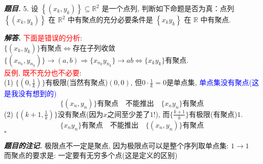 \documentclass[10pt, a4paper, oneside]{ctexart}
\newenvironment{problem}{\begin{framed}\par\noindent\textbf{\textit{题目. }}}{\end{framed}\par}
\newenvironment{solution}{%
  \par\noindent\textbf{\textit{解答. }}\ignorespaces
}{%
  \hfill\ensuremath{\square}\par %
}
\newenvironment{note}{\par\noindent\textbf{\textit{题目的注记. }}\ignorespaces}{\par}
\begin{document}
\begin{problem}
5. 设 $\left\{\left(x_k, y_k\right)\right\} \subseteq \mathbb{R}^2$ 是一个点列, 判断如下命题是否为真：点列 $\left\{\left(x_k, y_k\right)\right\}$ 在 $\mathbb{R}^2$ 中有聚点的充分必要条件是 $\left\{x_k y_k\right\}$ 在 $\mathbb{R}$ 中有聚点.
\end{problem}
\begin{solution}\textcolor{red}{下面是错误的分析}: \\$\{(x_k,y_k)\}$有聚点$\iff$存在子列收敛$\{(x_{n_k},y_{n_k})\}\to (a,b)\Rightarrow \{x_{n_k}y_{n_k}\}\to ab \iff \{x_ky_k\}$有聚点.\\
\textcolor{red}{反例, 既不充分也不必要}: \\
(1) $\{(0,\frac{1}{k})\}$有极限(当然有聚点)$(0,0)$, 但$0\cdot \frac{1}{k}=0$是单点集, \textcolor{blue}{单点集没有聚点(这是我没有想到的)}
$$\{(x_n,y_n)\}\text{有聚点}\quad \text{不能推出}\quad \{x_ny_n\}\text{有聚点}$$
(2) $\{(k+1, \frac{1}{k})\}$没有聚点(因为$x$之间至少差了$1$!), 而$\{\frac{k+1}{k}\}$有极限(有聚点)$1$.
$$\{x_ny_n\}\text{有聚点}\quad \text{不能推出}\quad \{(x_n,y_n)\}\text{有聚点}$$
\end{solution}
\begin{note}
    极限点不一定是聚点, 因为极限点可以是整个序列取单点集: $1\to 1$\\
    而聚点的要求是: 一定要有无穷多个点(这是定义的区别)
\end{note}
\end{document}
